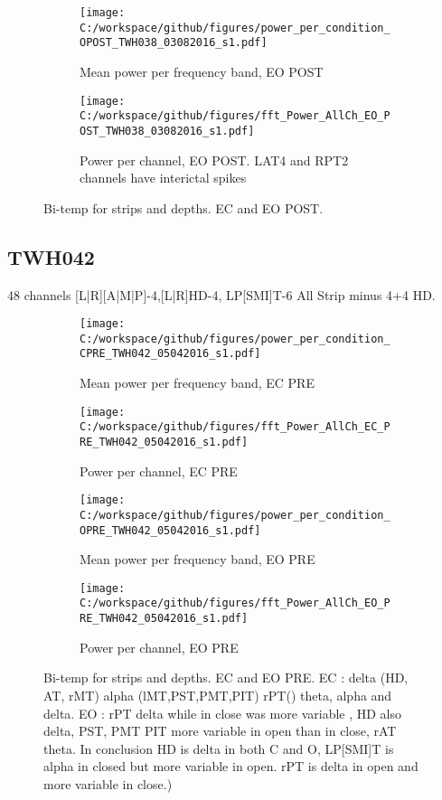\documentclass[11pt, onecolumn]{article}
\begin{document}
{\begin{figure}[t!]
\medskip
\begin{subfigure}{0.48\textwidth}
\texttt{[image: C:/workspace/github/figures/power\_per\_condition\_OPOST\_TWH038\_03082016\_s1.pdf]}
\caption{Mean power per frequency band, EO POST} \label{fig:a}
\end{subfigure}\hspace*{\fill}
\begin{subfigure}{0.48\textwidth}
\texttt{[image: C:/workspace/github/figures/fft\_Power\_AllCh\_EO\_POST\_TWH038\_03082016\_s1.pdf]}
\caption{Power per channel, EO POST. LAT4 and RPT2 channels have interictal spikes} \label{fig:b}
\end{subfigure}
\caption{Bi-temp for strips and depths. EC and EO POST.} \label{fig:38PRE}
\end{figure}



\subsection{TWH042}

48 channels [L|R][A|M|P]-4,[L|R]HD-4, LP[SMI]T-6  All Strip minus 4+4 HD.

\begin{figure}[t!]
\begin{subfigure}{0.48\textwidth}
\texttt{[image: C:/workspace/github/figures/power\_per\_condition\_CPRE\_TWH042\_05042016\_s1.pdf]}
\caption{Mean power per frequency band, EC PRE} \label{fig:a}
\end{subfigure}\hspace*{\fill}
\begin{subfigure}{0.48\textwidth}
\texttt{[image: C:/workspace/github/figures/fft\_Power\_AllCh\_EC\_PRE\_TWH042\_05042016\_s1.pdf]}
\caption{Power per channel, EC PRE} \label{fig:b}
\end{subfigure}

\medskip
\begin{subfigure}{0.48\textwidth}
\texttt{[image: C:/workspace/github/figures/power\_per\_condition\_OPRE\_TWH042\_05042016\_s1.pdf]}
\caption{Mean power per frequency band, EO PRE} \label{fig:a}
\end{subfigure}\hspace*{\fill}
\begin{subfigure}{0.48\textwidth}
\texttt{[image: C:/workspace/github/figures/fft\_Power\_AllCh\_EO\_PRE\_TWH042\_05042016\_s1.pdf]}
\caption{Power per channel, EO PRE} \label{fig:b}
\end{subfigure}
\caption{Bi-temp for strips and depths. EC and EO PRE.
EC : delta (HD, AT, rMT) alpha (lMT,PST,PMT,PIT) rPT() theta, alpha and delta.
EO : rPT delta while in close was more variable , HD also delta, PST, PMT PIT more variable in open than in close, rAT theta. In conclusion HD is delta in both C and O, LP[SMI]T is alpha in closed but more variable in open. rPT is delta in open and more variable in close.)
} \label{fig:42PRE}
\end{figure}

}
\end{document}
